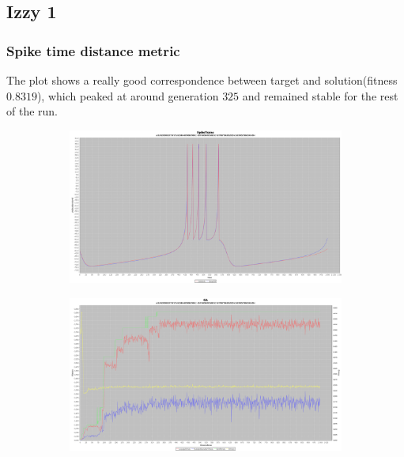 \documentclass[10pt]{article}
\begin{document}
	\subsection{Izzy 1}
		\subsubsection{Spike time distance metric}
			The plot shows a really good correspondence between target and solution(fitness $0.8319$), which peaked at around generation $325$ and remained stable for the rest of the run.
			\begin{figure}[H]
				\centering
					\begin{subfigure}{.5\textwidth}
						\centering
						\includegraphics[width=\linewidth]{./../images/izzy1/time/plot.png}
						
						\label{fig:sub1a}
					\end{subfigure}%
					\begin{subfigure}{.5\textwidth}
						\centering
						\includegraphics[width=\linewidth]{./../images/izzy1/time/prog.png}
						
						\label{fig:sub1b}
					\end{subfigure}
					\label{fig:plot1}
			\end{figure}
			
\end{document}

